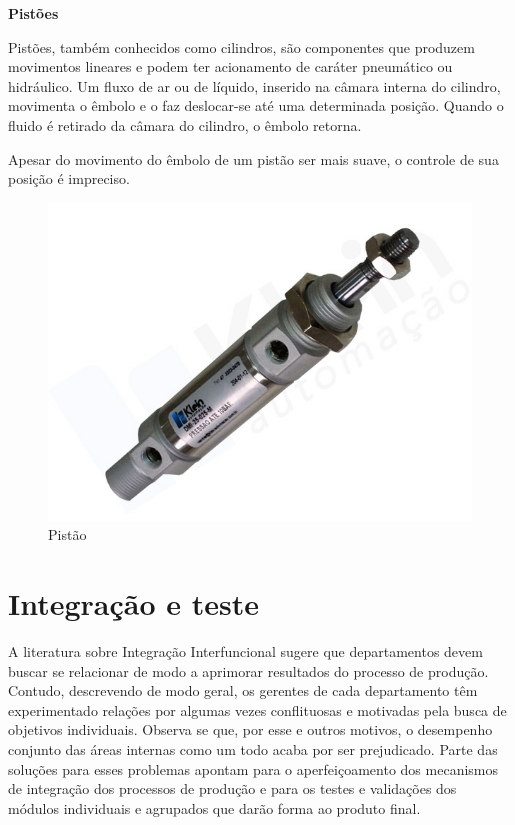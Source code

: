 \begin{anexosenv}
\textbf{Pistões}

Pistões, também conhecidos como cilindros, são componentes que produzem movimentos lineares e podem ter acionamento de caráter pneumático ou hidráulico. Um fluxo de ar ou de líquido, inserido na câmara interna do cilindro, movimenta o êmbolo e o faz deslocar-se até uma determinada posição. Quando o fluido é retirado da câmara do cilindro, o êmbolo retorna.

Apesar do movimento do êmbolo de um pistão ser mais suave, o controle de sua posição é impreciso.

\begin{figure}[htb]
		\centering
			\includegraphics[scale=0.6]{figuras/pistao.png}
		\caption{Pistão}
		\label{pistao}
\end{figure}



\section[Integração e teste]{Integração e teste}

A literatura sobre Integração Interfuncional sugere que departamentos devem buscar se relacionar de modo a aprimorar resultados do processo de produção. Contudo, descrevendo de modo geral, os gerentes de cada departamento têm experimentado relações por algumas vezes conflituosas e motivadas pela busca de objetivos individuais. Observa se que,  por esse e outros motivos, o desempenho conjunto das áreas internas como um todo acaba por ser prejudicado. Parte das soluções para esses problemas apontam para o aperfeiçoamento dos mecanismos de integração dos processos de produção e para os testes e validações dos módulos individuais e agrupados que darão forma ao produto final.


\end{anexosenv}
